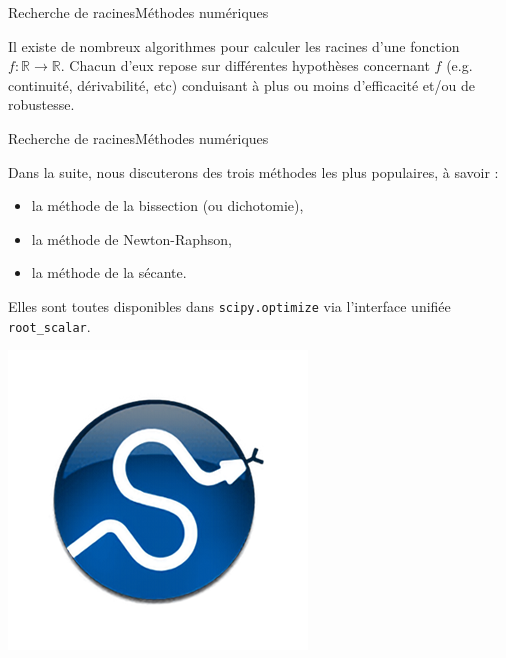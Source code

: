 \documentclass[usenames,dvipsnames,svgnames,10pt,aspectratio=169]{beamer}
\begin{document}
\begin{frame}[t, c]{Recherche de racines}{Méthodes numériques}
  \begin{minipage}{.68\textwidth}
    Il existe de nombreux algorithmes pour calculer les racines d'une fonction $f : \mathbb{R} \to \mathbb{R}$.
    Chacun d'eux repose sur différentes hypothèses concernant $f$ (e.g. continuité, dérivabilité, etc) conduisant à plus ou moins d'efficacité et/ou de robustesse.
  \end{minipage}%
  \hfill
  \begin{minipage}{.28\textwidth}
  \end{minipage}

  \vspace{1cm}
\end{frame}


\begin{frame}[t, c, fragile]{Recherche de racines}{Méthodes numériques}
  \begin{minipage}{.68\textwidth}
    Dans la suite, nous discuterons des trois méthodes les plus populaires, à savoir :
    \begin{itemize}
    \item la méthode de la bissection (ou dichotomie),
    \item la méthode de Newton-Raphson,
    \item la méthode de la sécante.
    \end{itemize}

    \bigskip

    Elles sont toutes disponibles dans \verb+scipy.optimize+ via l'interface unifiée \verb+root_scalar+.
  \end{minipage}%
  \hfill
  \begin{minipage}{.28\textwidth}
    \centering
    \includegraphics[width=\textwidth]{scipy_logo}
  \end{minipage}
\end{frame}
\end{document}
